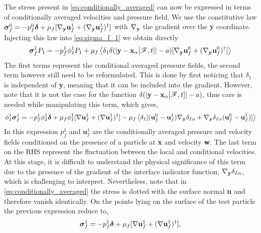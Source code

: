 The stress present in \ref{eq:conditionally_averaged} can now be expressed in terms of conditionally averaged velocities and pressure field. 
We use the constitutive law $\bm\sigma_f^0 = -p_f^0 \bm\delta + \mu_f [{\mathbf{\nabla}_\textbf{y}} \textbf{u}_f^1+ ({\mathbf{\nabla}_\textbf{y}} \textbf{u}_f^1)^\dagger]$ with ${\mathbf{\nabla}_\textbf{y}}$ the gradient over the \textbf{y} coordinate.
Injecting this law into \ref{eq:sigma_f_1} we obtain directly 
\begin{equation*}
    \bm\sigma^1_f
    P_1
    = 
    - p^1_f
    \phi_I^1
    P_1
    + \mu_f \left<
        \delta_1
        \delta(|\textbf{y} - \textbf{x}_\alpha[\mathscr{F},t]|-a)
        [
            {\mathbf{\nabla}_\textbf{y}} \textbf{u}_f^0
            + ({\mathbf{\nabla}_\textbf{y}} \textbf{u}_f^0)^\dagger
        ]
        \right>
\end{equation*}
The first terms represent the conditional averaged pressure fields, the second term however still need to be reformulated. 
This is done by first noticing that $\delta_1$ is independent of \textbf{y}, meaning that it can be included into the gradient. 
However, note that it is not the case for the function $\delta(|\textbf{y} - \textbf{x}_\alpha[\mathscr{F},t]|-a)$, thus care is needed while manipulating this term, which gives,
\begin{equation*}
    \phi_I^1 \bm\sigma_f^1
    = - p_f^1 \phi_I^1 \bm\delta
    +\mu_f \phi_I^1 [\grad \textbf{u}_f^1+(\grad \textbf{u}_f^1)^\dagger]
    - \mu_f\avg{
        \delta_1
        [(\textbf{u}_f^0 - \textbf{u}_f^1)\pddy \delta_{I\alpha}
        + \pddy \delta_{I\alpha} (\textbf{u}_f^0 - \textbf{u}_f^1)]
    }
    \label{eq:stress_final}
\end{equation*}
In this expression $p_f^1$ and $\textbf{u}_f^1$ are the conditionally averaged pressure and velocity fields conditioned on the presence of a particle at \textbf{x} and velocity \textbf{w}. 
The last term on the RHS represent the fluctuation between the local and conditional velocities. 
At this stage, it is difficult to understand the physical significance of this term due to the presence of the gradient of the interface indicator function, ${\mathbf{\nabla}_\textbf{y}} \delta_{I\alpha}$, which is challenging to interpret. 
Nevertheless, note that in \ref{eq:conditionally_averaged} the stress is dotted with the surface normal \textbf{n} and therefore vanish identically. 
On the points lying on the surface of the test particle the previous expression reduce to, 
\begin{equation*}
    \bm\sigma_f^1
    = - p_f^1 \bm\delta
    +\mu_f [\mathbf{\nabla} \textbf{u}_f^1+(\mathbf{\nabla} \textbf{u}_f^1)^\dagger], 
\end{equation*}
